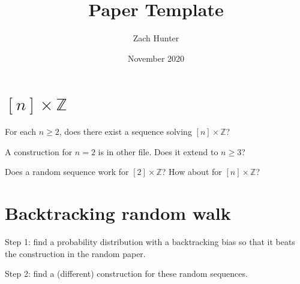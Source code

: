 \documentclass[a4paper]{article}
\title{Paper Template}
\author{Zach Hunter}
\date{November 2020}
\newcommand{\Z}{\mathbb{Z}}
\theoremstyle{definition}
\begin{document}
\maketitle





\section{$[n]\times\Z$}

For each $n \ge 2$, does there exist a sequence solving $[n]\times\mathbb{Z}$?

A construction for $n=2$ is in other file. Does it extend to $n \ge 3$?

Does a random sequence work for $[2]\times\Z$? How about for $[n]\times\Z$?

\section{Backtracking random walk}

Step 1: find a probability distribution with a backtracking bias so that it beats the construction in the random paper. 

Step 2: find a (different) construction for these random sequences. 
\end{document}
